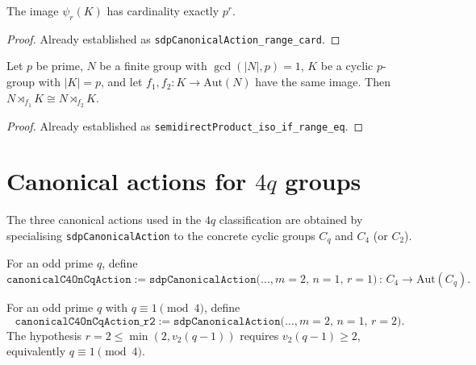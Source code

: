 \begin{lemma}
    \label{lem:sdp-canonical-range}
    The image $\psi_r(K)$ has cardinality exactly $p^r$.
\end{lemma}
\begin{proof}
    Already established as \texttt{sdpCanonicalAction\_range\_card}.
\end{proof}

\begin{lemma}
    \label{lem:sdp-iso-range-eq}
    Let $p$ be prime, $N$ be a finite group with $\gcd(|N|, p) = 1$, $K$ be a
    cyclic $p$-group with $|K| = p$, and let
    $f_1, f_2 : K \to \mathrm{Aut}(N)$ have the same image. Then
    $N \rtimes_{f_1} K \cong N \rtimes_{f_2} K$.
\end{lemma}
\begin{proof}
    Already established as \texttt{semidirectProduct\_iso\_if\_range\_eq}.
\end{proof}

\section{Canonical actions for $4q$ groups}

The three canonical actions used in the $4q$ classification are obtained by
specialising \texttt{sdpCanonicalAction} to the concrete cyclic groups
$C_q$ and $C_4$ (or $C_2$).

\begin{definition}
    \label{def:canonicalC4OnCq-r1}
    For an odd prime $q$, define
    \[
        \mathtt{canonicalC4OnCqAction} :=
            \mathtt{sdpCanonicalAction}\bigl(\dots, m = 2,\, n = 1,\, r = 1\bigr)
            \,:\, C_4 \to \mathrm{Aut}(C_q).
    \]
\end{definition}

\begin{definition}
    \label{def:canonicalC4OnCq-r2}
    For an odd prime $q$ with $q \equiv 1 \pmod 4$, define
    \[
        \mathtt{canonicalC4OnCqAction\_r2} :=
            \mathtt{sdpCanonicalAction}\bigl(\dots, m = 2,\, n = 1,\, r = 2\bigr).
    \]
    The hypothesis $r = 2 \leq \min(2, v_2(q - 1))$ requires $v_2(q-1) \geq 2$,
    equivalently $q \equiv 1 \pmod 4$.
\end{definition}

